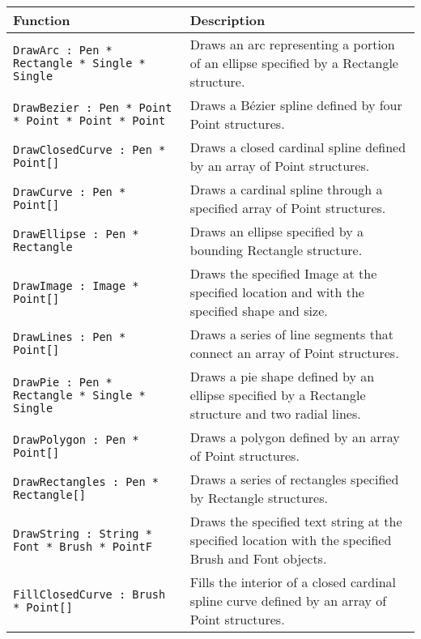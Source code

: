 \begin{table}
  \begin{center}
    \begin{tabularx}{\linewidth}{|l|X|}
      \hline
      \rowcolor{headerRowColor}  Function & Description\\
      \hline
      \lstinline{DrawArc : Pen * Rectangle * Single * Single}
      &Draws an arc representing a portion of an ellipse specified by a Rectangle structure.\\
      \hline
      \lstinline{DrawBezier : Pen * Point * Point * Point * Point}	
      &Draws a Bézier spline defined by four Point structures.\\
      \hline
      \lstinline{DrawClosedCurve : Pen * Point[]}	
      &Draws a closed cardinal spline defined by an array of Point structures.\\
      \hline
      \lstinline{DrawCurve : Pen * Point[]}	
      &Draws a cardinal spline through a specified array of Point structures.\\
      \hline
      \lstinline{DrawEllipse : Pen * Rectangle}	
      &Draws an ellipse specified by a bounding Rectangle structure.\\
      \hline
      \lstinline{DrawImage : Image * Point[]}	
      &Draws the specified Image at the specified location and with the specified shape and size.\\
      \hline
      \lstinline{DrawLines : Pen * Point[]}	
      &Draws a series of line segments that connect an array of Point structures.\\
      \hline
      \lstinline{DrawPie : Pen * Rectangle * Single * Single}	
      &Draws a pie shape defined by an ellipse specified by a Rectangle structure and two radial lines.\\
      \hline
      \lstinline{DrawPolygon : Pen * Point[]}	
      &Draws a polygon defined by an array of Point structures.\\
      \hline
      \lstinline{DrawRectangles : Pen * Rectangle[]}	
      &Draws a series of rectangles specified by Rectangle structures.\\
      \hline
      \lstinline{DrawString : String * Font * Brush * PointF}	
      &Draws the specified text string at the specified location with the specified Brush and Font objects.\\
      \hline
      \lstinline{FillClosedCurve : Brush * Point[]}	
      &Fills the interior of a closed cardinal spline curve defined by an array of Point structures.\\

\end{tabularx}
\end{center}
\end{table}
